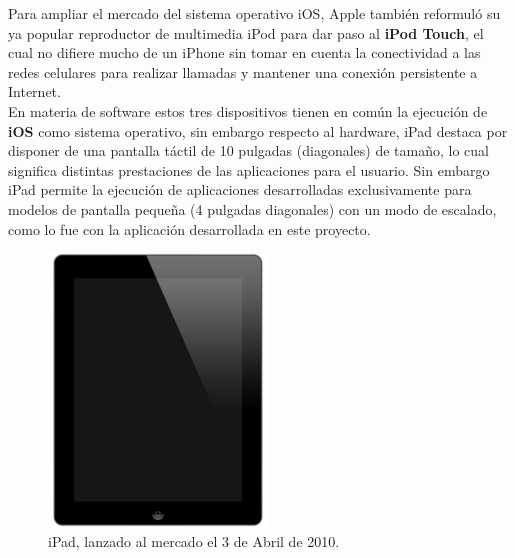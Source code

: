 Para ampliar el mercado del sistema operativo iOS, Apple también reformuló su ya popular reproductor de multimedia iPod para dar paso al \textbf{iPod Touch}, el cual no difiere mucho de un iPhone sin tomar en cuenta la conectividad a las redes celulares para realizar llamadas y mantener una conexión persistente a Internet.\\

En materia de software estos tres dispositivos tienen en común la ejecución de \textbf{iOS} como sistema operativo, sin embargo respecto al hardware, iPad destaca por disponer de una pantalla táctil de 10 pulgadas (diagonales) de tamaño, lo cual significa distintas prestaciones de las aplicaciones para el usuario. Sin embargo iPad permite la ejecución de aplicaciones desarrolladas exclusivamente para modelos de pantalla pequeña (4 pulgadas diagonales) con un modo de escalado, como lo fue con la aplicación desarrollada en este proyecto.

\begin{figure}[H]
	\centering
	\includegraphics[scale=0.4]{imgs/ipad-hw.png} 
	\caption{iPad, lanzado al mercado el 3 de Abril de 2010.}
	\label{img:ipad-hw}
\end{figure} 	 
		 
		


	
